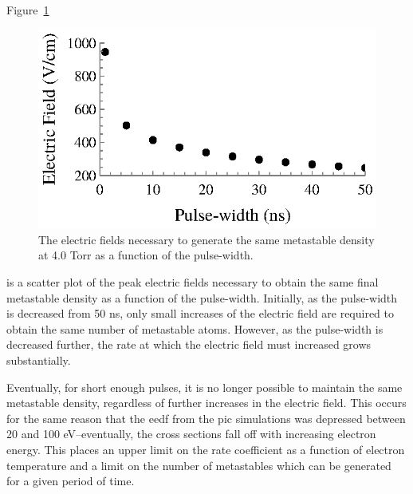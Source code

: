 Figure~\ref{fig:fieldtau}
\begin{figure}
  \centering
  \includegraphics{./chapters/modeling/figures/fieldtau.eps}
  \caption{The electric fields necessary to generate the same metastable density
    at 4.0 Torr as a function of the pulse-width.}
  \label{fig:fieldtau}
\end{figure}
is a scatter plot of the peak electric fields necessary to obtain the same final
metastable density as a function of the pulse-width. Initially, as the
pulse-width is decreased from 50 ns, only small increases of the electric field
are required to obtain the same number of metastable atoms. However, as the
pulse-width is decreased further, the rate at which the electric field must
increased grows substantially.

Eventually, for short enough pulses, it is no longer possible to maintain the
same metastable density, regardless of further increases in the electric field.
This occurs for the same reason that the \acs{eedf} from the \acs{pic}
simulations was depressed between 20 and 100 eV--eventually, the cross sections
fall off with increasing electron energy. This places an upper limit on the rate
coefficient as a function of electron temperature and a limit on the number of
metastables which can be generated for a given period of time.

